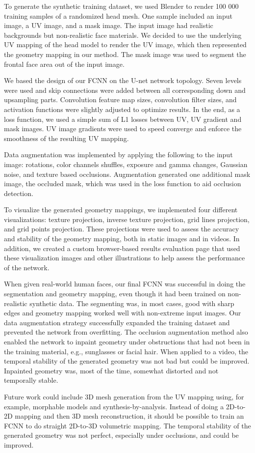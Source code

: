 To generate the synthetic training dataset, we used Blender to render 100 000 training samples of a randomized head mesh. One sample included an input image, a UV image, and a mask image. The input image had realistic backgrounds but non-realistic face materials. We decided to use the underlying UV mapping of the head model to render the UV image, which then represented the geometry mapping in our method. The mask image was used to segment the frontal face area out of the input image.

We based the design of our \ac{FCNN} on the U-net network topology. Seven levels were used and skip connections were added between all corresponding down and upsampling parts. Convolution feature map sizes, convolution filter sizes, and activation functions were slightly adjusted to optimize results. In the end, as a loss function, we used a simple sum of L1 losses between UV, UV gradient and mask images. UV image gradients were used to speed converge and enforce the smoothness of the resulting UV mapping.

Data augmentation was implemented by applying the following to the input image: rotations, color channels shuffles, exposure and gamma changes, Gaussian noise, and texture based occlusions. Augmentation generated one additional mask image, the occluded mask, which was used in the loss function to aid occlusion detection.

To visualize the generated geometry mappings, we implemented four different visualizations: texture projection, inverse texture projection, grid lines projection, and grid points projection. These projections were used to assess the accuracy and stability of the geometry mapping, both in static images and in videos. In addition, we created a custom browser-based results evaluation page that used these visualization images and other illustrations to help assess the performance of the network.

When given real-world human faces, our final \ac{FCNN} was successful in doing the segmentation and geometry mapping, even though it had been trained on non-realistic synthetic data. The segmenting was, in most cases, good with sharp edges and geometry mapping worked well with non-extreme input images. Our data augmentation strategy successfully expanded the training dataset and prevented the network from overfitting. The occlusion augmentation method also enabled the network to inpaint geometry under obstructions that had not been in the training material, e.g., sunglasses or facial hair. When applied to a video, the temporal stability of the generated geometry was not bad but could be improved. Inpainted geometry was, most of the time, somewhat distorted and not temporally stable.

Future work could include 3D mesh generation from the UV mapping using, for example, morphable models and synthesis-by-analysis. Instead of doing a 2D-to-2D mapping and then 3D mesh reconstruction, it should be possible to train an \ac{FCNN} to do straight 2D-to-3D volumetric mapping. The temporal stability of the generated geometry was not perfect, especially under occlusions, and could be improved.
